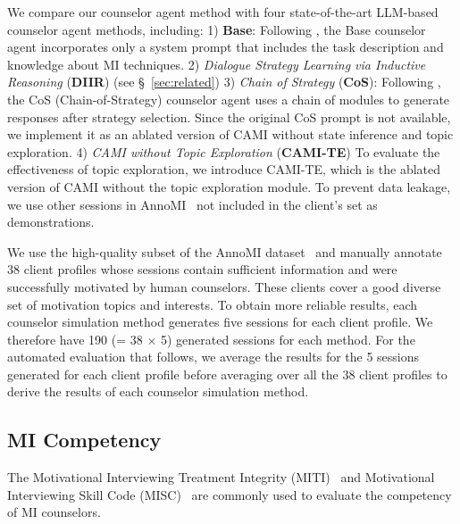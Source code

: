 We compare our counselor agent method with four state-of-the-art LLM-based counselor agent methods, including: 1) \textbf{Base}: Following \citet{steenstra2024virtual}, the Base counselor agent incorporates only a system prompt that includes the task description and knowledge about MI techniques. 2) \textit{Dialogue Strategy Learning via Inductive Reasoning} (\textbf{DIIR}) (see §~\ref{sec:related}) 
3) \textit{Chain of Strategy} (\textbf{CoS}): Following \citet{hsu2023helping,sun2024chain}, the CoS (Chain-of-Strategy) counselor agent uses a chain of modules to generate responses after strategy selection. Since the original CoS prompt is not available, we implement it as an ablated version of CAMI without state inference and topic exploration. 4) \textit{CAMI without Topic Exploration} (\textbf{CAMI-TE}) To evaluate the effectiveness of topic exploration, we introduce CAMI-TE, which is the ablated version of CAMI without the topic exploration module. 
To prevent data leakage, we use other sessions in AnnoMI~\citep{wu2022anno,wu2023creation} not included in the client's set as demonstrations.

We use the high-quality subset of the AnnoMI dataset~\citep{wu2022anno,wu2023creation} and manually annotate 38 client profiles whose sessions contain sufficient information and were successfully motivated by human counselors. These clients cover a good diverse set of motivation topics and interests. To obtain more reliable results, each counselor simulation method generates five sessions for each client profile. We therefore have 190 (= 38 $\times$ 5) generated sessions for each method.  For the automated evaluation that follows, we average the results for the 5 sessions generated for each client profile before averaging over all the 38 client profiles to derive the results of each counselor simulation method. 

\subsection{MI Competency}
\label{sec:mi competence}
The Motivational Interviewing Treatment Integrity (MITI)~\citep{moyers2016motivational} and Motivational Interviewing Skill Code (MISC)~\citep{miller2003manual} are commonly used to evaluate the competency of MI counselors. 

